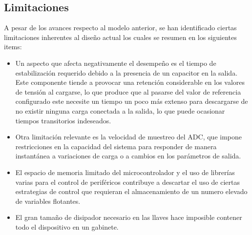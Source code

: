 \subsection{Limitaciones} \label{S:limitaciones} 
A pesar de los avances respecto al modelo anterior, se han identificado ciertas limitaciones inherentes al diseño actual los cuales se resumen en los siguientes items:  
\begin{itemize}
    \item Un aspecto que afecta negativamente el desempeño es el tiempo de estabilización requerido debido a la presencia de un capacitor en la salida. Este componente tiende a provocar una retención considerable en los valores de tensión al cargarse, lo que produce que al pasarse del valor de referencia configurado este necesite un tiempo un poco más extenso para descargarse de no existir ninguna carga conectada a la salida, lo que puede ocasionar tiempos transitorios indeseados. 
    \item Otra limitación relevante es la velocidad de muestreo del ADC, que impone restricciones en la capacidad del sistema para responder de manera instantánea a variaciones de carga o a cambios en los parámetros de salida.
    \item El espacio de memoria limitado del microcontrolador  y el uso de librerías varias para el control de periféricos contribuye a descartar el uso de ciertas estrategias de control que requieran el almacenamiento de un numero elevado de variables flotantes.   
    \item El gran tamaño de disipador necesario en las llaves hace imposible contener todo el dispositivo en un gabinete.  
\end{itemize}

